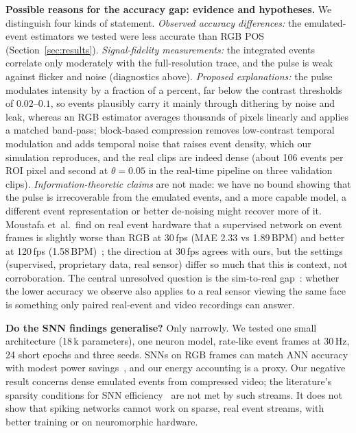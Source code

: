 \documentclass[10pt,journal]{IEEEtran}
\begin{document}
\textbf{Possible reasons for the accuracy gap: evidence and hypotheses.} We distinguish four kinds of statement. \emph{Observed accuracy differences:} the emulated-event estimators we tested were less accurate than RGB POS (Section~\ref{sec:results}). \emph{Signal-fidelity measurements:} the integrated events correlate only moderately with the full-resolution trace, and the pulse is weak against flicker and noise (diagnostics above). \emph{Proposed explanations:} the pulse modulates intensity by a fraction of a percent, far below the contrast thresholds of $0.02$--$0.1$, so events plausibly carry it mainly through dithering by noise and leak, whereas an RGB estimator averages thousands of pixels linearly and applies a matched band-pass; block-based compression removes low-contrast temporal modulation and adds temporal noise that raises event density, which our simulation reproduces, and the real clips are indeed dense (about 106 events per ROI pixel and second at $\theta=0.05$ in the real-time pipeline on three validation clips). \emph{Information-theoretic claims} are not made: we have no bound showing that the pulse is irrecoverable from the emulated events, and a more capable model, a different event representation or better de-noising might recover more of it. Moustafa et~al.\ find on real event hardware that a supervised network on event frames is slightly worse than RGB at 30\,fps (MAE 2.33 vs 1.89\,BPM) and better at 120\,fps (1.58\,BPM)~\cite{moustafa2025event}; the direction at 30\,fps agrees with ours, but the settings (supervised, proprietary data, real sensor) differ so much that this is context, not corroboration. The central unresolved question is the sim-to-real gap~\cite{stoffregen2020simreal}: whether the lower accuracy we observe also applies to a real sensor viewing the same face is something only paired real-event and video recordings can answer.

\textbf{Do the SNN findings generalise?} Only narrowly. We tested one small architecture (18\,k parameters), one neuron model, rate-like event frames at 30\,Hz, 24 short epochs and three seeds. SNNs on RGB frames can match ANN accuracy with modest power savings~\cite{liu2025spikingphysformer}, and our energy accounting is a proxy. Our negative result concerns dense emulated events from compressed video; the literature's sparsity conditions for SNN efficiency~\cite{dampfhoffer2023} are not met by such streams. It does not show that spiking networks cannot work on sparse, real event streams, with better training or on neuromorphic hardware.
\end{document}
